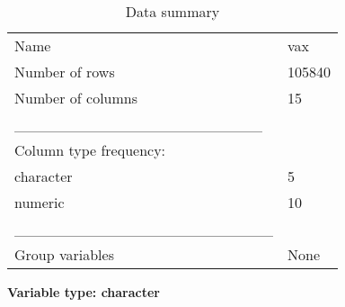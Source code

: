 \documentclass[
]{article}
\begin{document}
\begin{longtable}[]{@{}ll@{}}
\caption{Data summary}\tabularnewline
\toprule
\endhead
Name & vax \\
Number of rows & 105840 \\
Number of columns & 15 \\
\_\_\_\_\_\_\_\_\_\_\_\_\_\_\_\_\_\_\_\_\_\_\_ & \\
Column type frequency: & \\
character & 5 \\
numeric & 10 \\
\_\_\_\_\_\_\_\_\_\_\_\_\_\_\_\_\_\_\_\_\_\_\_\_ & \\
Group variables & None \\
\bottomrule
\end{longtable}

\textbf{Variable type: character}
\end{document}
